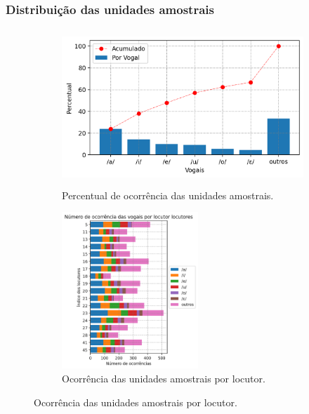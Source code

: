 \documentclass[121pt, aspectratio=169, t]{beamer}
\begin{document}
\begin{frame}[fragile=singleslide]
	\frametitle{Distribuição das unidades amostrais}
	\begin{figure}
		\centering
		\begin{subfigure}[t]{8.5cm}
			\includegraphics[height=5.9cm]{Vowels_Count.png}
			\caption{Percentual de ocorrência das unidades amostrais.}
		\end{subfigure}
		\hfill
		\begin{subfigure}[t]{4.75cm}
			\centering
			\includegraphics[height=5.9cm]{PLT_01_Sons_Contexto.png}
			\caption{Ocorrência das unidades amostrais por locutor.}
		\end{subfigure}
	\end{figure}

\end{frame}
\end{document}
